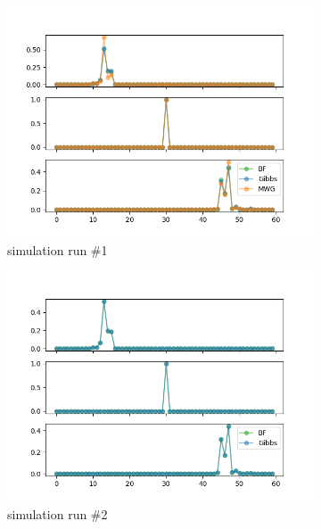 \begin{figure}[H]
    \centering
    \begin{subfigure}{.3\textwidth}
    	\centering
        \includegraphics[width=\linewidth]{../../plots/Posterior_post_burnin_M4_N60_NMCMC3_seed0_diffind2.png}
        \caption{simulation run \#1}
    \end{subfigure}
    \begin{subfigure}{.3\textwidth}
        \centering
    	\includegraphics[width=\linewidth]{../../plots/Posterior_post_burnin_M4_N60_NMCMC3_seed1_diffind2.png}
    	\caption{simulation run \#2}
	\end{subfigure}
	\begin{subfigure}{.3\textwidth}

\end{subfigure}
\end{figure}
